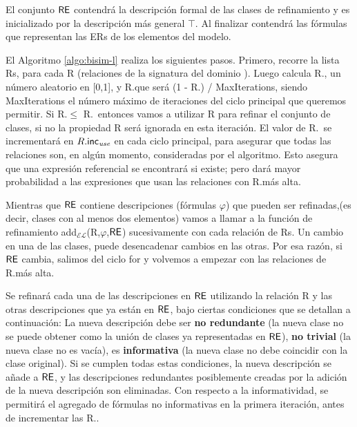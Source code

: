 El conjunto $\textsf{RE}$ contendr\'a la descripci\'on formal de las clases de refinamiento
y es inicializado por la descripci\'on m\'as general $\top$. Al finalizar contendr\'a las f\'ormulas que representan las ERs de los elementos del modelo.

El Algoritmo \ref{algo:bisim-l} realiza los siguientes pasos. Primero, recorre la lista Rs, para cada R (relaciones de la signatura del dominio \REL). Luego calcula R.\randomuse, un n\'umero aleatorio en [0,1], y R.\incuse que ser\'a (1 - R.\puse) / MaxIterations, siendo MaxIterations el n\'umero m\'aximo de iteraciones del ciclo principal que queremos permitir. Si R.\randomuse $\le$ R.\puse\ entonces vamos a utilizar R para refinar el conjunto de
clases, si no la propiedad R ser\'a ignorada en esta iteraci\'on. El valor de R.\puse\ se incrementar\'a en $R.\textsf{inc}_\emph{use}$
en cada ciclo principal, para asegurar que todas las relaciones son, en alg\'un momento,
consideradas por el algoritmo. Esto asegura que una expresi\'on referencial
se encontrar\'a si existe; pero dar\'a mayor probabilidad a las expresiones
que usan las relaciones con R.\puse m\'as alta. 

Mientras que $\textsf{RE}$ contiene descripciones (f\'ormulas $\varphi$) que pueden ser refinadas,(es decir, clases
con al menos dos elementos) vamos a llamar a la funci\'on de refinamiento
add$_\mathcal{EL}$(R,$\varphi$,$\textsf{RE}$) sucesivamente con cada relaci\'on
de Rs. Un cambio en una de las clases, puede desencadenar cambios en
las otras. Por esa raz\'on, si $\textsf{RE}$ cambia, salimos del ciclo for y volvemos a
empezar con las relaciones de R.\puse m\'as alta. 

Se refinar\'a cada una de las descripciones
en $\textsf{RE}$ utilizando la relaci\'on R y las otras descripciones que ya est\'an en
$\textsf{RE}$, bajo ciertas condiciones que se detallan a continuaci\'on: 
La nueva descripci\'on debe ser
\textbf{no redundante} (la nueva clase no se puede obtener como la uni\'on de
clases ya representadas en $\textsf{RE}$), \textbf{no trivial} (la nueva
clase no es vac\'{i}a), es \textbf{informativa} (la nueva clase no debe
coincidir con la clase original). Si se cumplen todas estas condiciones,
la nueva descripci\'on se a\~nade a $\textsf{RE}$, y las descripciones redundantes
posiblemente creadas por la adici\'on de la nueva descripci\'on son
eliminadas.
Con respecto a la informatividad, se permitir\'a el agregado de f\'ormulas no informativas en la primera iteraci\'on, antes de incrementar las R.\puse.

